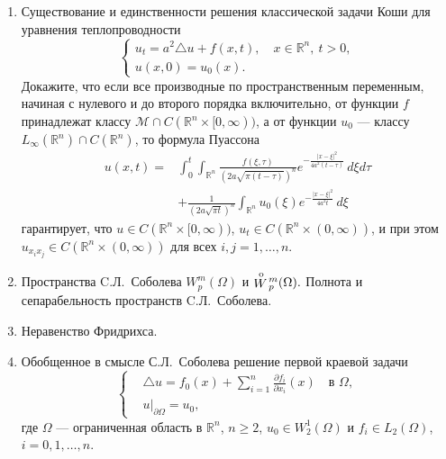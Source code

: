 \documentclass[12pt,a4paper,draft]{article}
\DeclareRobustCommand*{\т}{~--- }
\DeclareRobustCommand*{\ч}{~-- }
\begin{document}
\begin{enumerate}
\item
Существование и единственности решения классической задачи Коши
для уравнения теплопроводности
$$
    \left\{
        \begin{array}{l}
            u_t = a^2 \triangle u + f (x, t),
            \quad
            x \in {\mathbb R}^n,
            \:
            t > 0,
            \\
            u (x, 0) = u_0 (x).
        \end{array}
    \right.
$$
Докажите, что если все производные по пространственным переменным,
начиная с нулевого и до второго порядка включительно, от функции
$f$ принадлежат классу ${\mathcal M} \cap C ({\mathbb R}^n \times
[0, \infty))$, а от функции $u_0$ --- классу $L_\infty ({\mathbb
R}^n) \cap C ({\mathbb R}^n)$, то формула Пуассона
\begin{align*}
    u (x, t)
    =
    {}
    &
    \int_0^t
    \int_{
        {\mathbb R}^n
    }
    \frac{
        f (\xi, \tau)
    }{
        (
            2
            a
            \sqrt {
                \pi
                (t - \tau)
            }
        )^n
    }
    e^{
        - \frac{
            |x - \xi|^2
        }{
            4
            a^2
            (t - \tau)
        }
    }
    \,
    d\xi
    d\tau
    \\
    &
    +
    \frac{
        1
    }{
        (
            2
            a
            \sqrt {
                \pi
                t
            }
        )^n
    }
    \int_{
        {\mathbb R}^n
    }
    u_0 (\xi)
    e^{
        - \frac{
            |x - \xi|^2
        }{
            4
            a^2
            t
        }
    }
    \,
    d\xi
\end{align*}
гарантирует, что $u \in C ({\mathbb R}^n \times [0, \infty))$,
$u_t \in C ({\mathbb R}^n \times (0, \infty))$, и при этом $u_{x_i
x_j} \in C ({\mathbb R}^n \times (0, \infty))$ для всех $i, j = 1,
\ldots, n$.

\item
Пространства C.Л.~Соболева $
    W_p^m
    (
        \Omega
    )
$ и $
    \stackrel{\rm o}{W}\!{}_p^m
    (
        \Omega
    ).
$ Полнота и сепарабельность пространств C.Л.~Соболева.

\item
Неравенство Фридрихса.

\item
Обобщенное в смысле С.Л.~Соболева решение первой краевой задачи
$$
    \left\{
        \begin{aligned}
            &
            \triangle u
            =
            f_0 (x)
            +
            \sum_{i = 1}^n
            \frac{\partial f_i}{\partial x_i}
            (x)
            \quad
            \mbox{в } \Omega,
            \\
            &
            \left.
                u
            \right|_{
                \partial \Omega
            }
            =
            u_0,
        \end{aligned}
    \right.
$$
где $\Omega$ --- ограниченная область в ${\mathbb R}^n$, $n \ge
2$, $
    u_0
    \in
    W_2^1
    (
        \Omega
    )
$ и $f_i \in L_2 (\Omega)$, $i = 0,1,\ldots,n$.


\end{enumerate}
\end{document}
